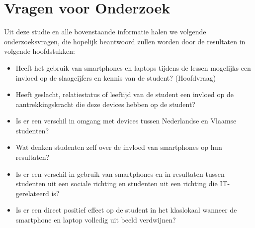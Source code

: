 \begin{landscape}
	\begin{table}[]
		\centering
		\caption{distributie examenresultaten Probleemoplossend Denken 1 academiejaar 2016-2017}
		\label{pod1ex}
	\end{table}
\end{landscape}

\section{Vragen voor Onderzoek}
\label{sec:eindliteratuur}

Uit deze studie en alle bovenstaande informatie halen we volgende onderzoeksvragen, die hopelijk beantwoord zullen worden door de resultaten in volgende hoofdstukken:

\begin{itemize}
	\item Heeft het gebruik van smartphones en laptops tijdens de lessen mogelijks een invloed op de slaagcijfers en kennis van de student? (Hoofdvraag)
	\item Heeft geslacht, relatiestatus of leeftijd van de student een invloed op de aantrekkingskracht die deze devices hebben op de student?
	\item Is er een verschil in omgang met devices tussen Nederlandse en Vlaamse studenten?
	\item Wat denken studenten zelf over de invloed van smartphones op hun resultaten?
	\item Is er een verschil in gebruik van smartphones en in resultaten tussen studenten uit een sociale richting en studenten uit een richting die IT-gerelateerd is?
	\item Is er een direct positief effect op de student in het klaslokaal wanneer de smartphone en laptop volledig uit beeld verdwijnen?
\end{itemize}
